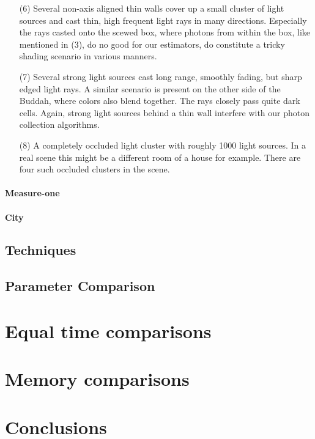 \begin{itemize}
    \item[(6)] Several non-axis aligned thin walls cover up a small cluster of light sources and cast thin, high frequent light rays in many directions. Especially the rays casted onto the scewed box, where photons from within the box, like mentioned in (3), do no good for our estimators, do constitute a tricky shading scenario in various manners.
    \item[(7)] Several strong light sources cast long range, smoothly fading, but sharp edged light rays. A similar scenario is present on the other side of the Buddah, where colors also blend together. The rays closely pass quite dark cells. Again, strong light sources behind a thin wall interfere with our photon collection algorithms.
    \item[(8)] A completely occluded light cluster with roughly 1000 light sources. In a real scene this might be a different room of a house for example. There are four such occluded clusters in the scene.
\label{li:stanfordmuseum}
\end{itemize}
\paragraph{Measure-one}




\paragraph{City}




\subsection{Techniques}


\subsection{Parameter Comparison}




\label{ch:ev:photontree}


\label{ch:ev:cdftree}


\section{Equal time comparisons}

\section{Memory comparisons}

\section{Conclusions}

